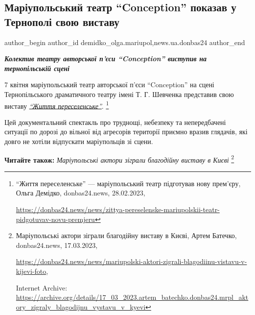  
 
 
 
 
 
\subsection{Маріупольський театр \enquote{Conception} показав у Тернополі свою виставу}
\label{sec:12_04_2023.stz.news.ua.donbas24.1.mrpl_teatr_conception_vystava_ternopil}
 
\ifcmt
 author_begin
   author_id demidko_olga.mariupol,news.ua.donbas24
 author_end
\fi


\begin{center}
  \em\color{blue}\bfseries\Large
  Колектив театру авторської п'єси \enquote{Conception} виступив на тернопільській сцені
\end{center}

7 квітня маріупольський театр авторської п'єси \enquote{Conception} на сцені
Тернопільського драматичного театру імені Т. Г. Шевченка представив свою
виставу \href{https://donbas24.news/news/zittya-pereselenske-mariupolskii-teatr-pidgotuvav-novu-premjeru}{%
\emph{\enquote{Життя переселенське}}}.%
\footnote{\enquote{Життя переселенське} — маріупольський театр підготував нову прем'єру, Ольга Демідко, donbas24.news, 28.02.2023, \par\url{https://donbas24.news/news/zittya-pereselenske-mariupolskii-teatr-pidgotuvav-novu-premjeru}}

Цей документальний спектакль про труднощі,
небезпеку та непередбачені ситуації по дорозі до вільної від агресорів
території приємно вразив глядачів, які довго не хотіли відпускати маріупольців
зі сцени.

\textbf{Читайте також:} \emph{Маріупольські актори зіграли благодійну виставу в Києві}%
\footnote{Маріупольські актори зіграли благодійну виставу в Києві, Артем Батечко, donbas24.news, 17.03.2023, \par%
\url{https://donbas24.news/news/mariupolski-aktori-zigrali-blagodiinu-vistavu-v-kijevi-foto}, \par%
Internet Archive: \url{https://archive.org/details/17_03_2023.artem_batechko.donbas24.mrpl_aktory_zigraly_blagodijnu_vystavu_v_kyevi}%
}

